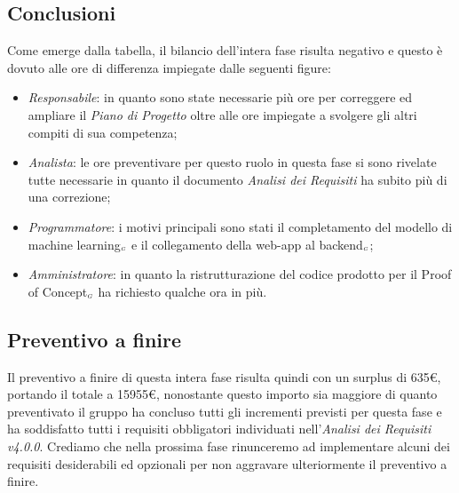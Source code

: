 {{{{{{{{{{{{\subsection{Conclusioni}\label{ConsuntivoPeriodoDiProgettazioneDettaglioCodificaConclusioni}
Come emerge dalla tabella, il bilancio dell'intera fase risulta negativo e questo è dovuto alle ore di differenza impiegate dalle seguenti figure:
\begin{itemize}
	\item \textit{Responsabile}: in quanto sono state necessarie più ore per correggere ed ampliare il \textit{Piano di Progetto} oltre alle ore impiegate a svolgere gli altri compiti di sua competenza;
	\item \textit{Analista}: le ore preventivare per questo ruolo in questa fase si sono rivelate tutte necessarie in quanto il documento \textit{Analisi dei Requisiti} ha subito più di una correzione;
	\item \textit{Programmatore}: i motivi principali sono stati il completamento del modello di machine learning$_{\scaleto{G}{3pt}}$ e il collegamento della web-app al backend$_{\scaleto{G}{3pt}}$;
	\item \textit{Amministratore}: in quanto la ristrutturazione del codice prodotto per il Proof of Concept$_{\scaleto{G}{3pt}}$ ha richiesto qualche ora in più.
\end{itemize}

\subsection{Preventivo a finire}\label{ConsuntivoPeriodoDiProgettazioneDettaglioCodificaPreventivoAFinire}
Il preventivo a finire di questa intera fase risulta quindi con un surplus di 635\euro, portando il totale a  15955\euro, nonostante questo importo sia maggiore di quanto preventivato il gruppo ha concluso tutti gli incrementi previsti per questa fase e ha soddisfatto tutti i requisiti obbligatori individuati nell'\textit{Analisi dei Requisiti v4.0.0}. Crediamo che nella prossima fase rinunceremo ad implementare alcuni dei requisiti desiderabili ed opzionali per non aggravare ulteriormente il preventivo a finire.











}}}}}}}}}}}}
